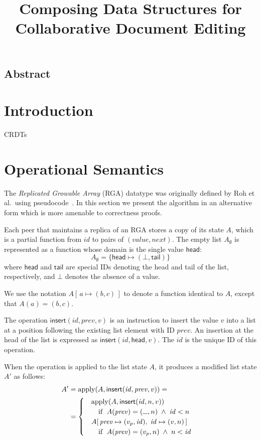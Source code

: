 \documentclass[a4paper,twocolumn,10pt]{article}
\newcommand\placeholder{%
  \makebox[0.7em]{%
    \kern.07em
    \vrule height.3ex
    \hrulefill
    \vrule height.3ex
    \kern.07em
  }%
}
\begin{document}
\sloppy
\title{Composing Data Structures for Collaborative Document Editing}
\author{}
\maketitle

\subsection*{Abstract}

\section{Introduction}

CRDTs~\cite{Shapiro:2011wy,Roh:2011dw}

\section{Operational Semantics}

The \emph{Replicated Growable Array} (RGA) datatype was originally defined by Roh et al.\ using pseudocode~\cite{Roh:2011dw}. In this section we present the algorithm in an alternative form which is more amenable to correctness proofs.

Each peer that maintains a replica of an RGA stores a copy of its state $A$, which is a partial function from $\mathit{id}$ to pairs of $(\mathit{value}, \mathit{next})$. The empty list $A_\emptyset$ is represented as a function whose domain is the single value $\mathsf{head}$:
$$ A_\emptyset = \{\mathsf{head} \mapsto (\bot, \mathsf{tail})\} $$
where $\mathsf{head}$ and $\mathsf{tail}$ are special IDs denoting the head and tail of the list, respectively, and $\bot$ denotes the absence of a value.

We use the notation $A[\,a \mapsto (b, c)\,]$ to denote a function identical to $A$, except that $A(a)=(b,c)$.

The operation $\mathsf{insert}(\mathit{id}, \mathit{prev}, v)$ is an instruction to insert the value $v$ into a list at a position following the existing list element with ID $\mathit{prev}$. An insertion at the head of the list is expressed as $\mathsf{insert}(\mathit{id}, \mathsf{head}, v)$. The $\mathit{id}$ is the unique ID of this operation.

When the operation is applied to the list state $A$, it produces a modified list state $A'$ as follows:
\begin{align*}
A' &= \mathrm{apply}(A, \mathsf{insert}(\mathit{id}, \mathit{prev}, v)) = \\ &=
\begin{cases}
\quad \mathrm{apply}(A, \mathsf{insert}(\mathit{id}, n, v)) \\
    \qquad\text{if }\; A(\mathit{prev}) = (\placeholder, n) \;\wedge\; \mathit{id} < n \\
\quad A[\,\mathit{prev} \mapsto (v_p, \mathit{id}),\; \mathit{id} \mapsto (v, n)\,] \\
    \qquad\text{if }\; A(\mathit{prev}) = (v_p, n) \;\wedge\; n < \mathit{id}
\end{cases}
\end{align*}

{\footnotesize

{}}
\end{document}
